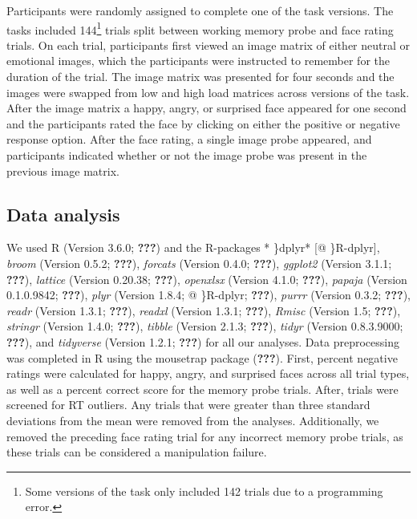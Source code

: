 \documentclass[man]{apa6}
\let\rmarkdownfootnote\footnote%
\def\footnote{\protect\rmarkdownfootnote}
\begin{document}
Participants were randomly assigned to complete one of the task versions. The tasks included 144\footnote{Some versions of the task only included 142 trials due to a programming error.} trials split between working memory probe and face rating trials. On each trial, participants first viewed an image matrix of either neutral or emotional images, which the participants were instructed to remember for the duration of the trial. The image matrix was presented for four seconds and the images were swapped from low and high load matrices across versions of the task. After the image matrix a happy, angry, or surprised face appeared for one second and the participants rated the face by clicking on either the positive or negative response option. After the face rating, a single image probe appeared, and participants indicated whether or not the image probe was present in the previous image matrix.

\hypertarget{data-analysis}{%
\subsection{Data analysis}\label{data-analysis}}

We used R (Version 3.6.0; {\textbf{???}}) and the R-packages * \}dplyr* {[}@ \}R-dplyr{]}, \emph{broom} (Version 0.5.2; {\textbf{???}}), \emph{forcats} (Version 0.4.0; {\textbf{???}}), \emph{ggplot2} (Version 3.1.1; {\textbf{???}}), \emph{lattice} (Version 0.20.38; {\textbf{???}}), \emph{openxlsx} (Version 4.1.0; {\textbf{???}}), \emph{papaja} (Version 0.1.0.9842; {\textbf{???}}), \emph{plyr} (Version 1.8.4; @ \}R-dplyr; {\textbf{???}}), \emph{purrr} (Version 0.3.2; {\textbf{???}}), \emph{readr} (Version 1.3.1; {\textbf{???}}), \emph{readxl} (Version 1.3.1; {\textbf{???}}), \emph{Rmisc} (Version 1.5; {\textbf{???}}), \emph{stringr} (Version 1.4.0; {\textbf{???}}), \emph{tibble} (Version 2.1.3; {\textbf{???}}), \emph{tidyr} (Version 0.8.3.9000; {\textbf{???}}), and \emph{tidyverse} (Version 1.2.1; {\textbf{???}}) for all our analyses. Data preprocessing was completed in R using the mousetrap package ({\textbf{???}}). First, percent negative ratings were calculated for happy, angry, and surprised faces across all trial types, as well as a percent correct score for the memory probe trials. After, trials were screened for RT outliers. Any trials that were greater than three standard deviations from the mean were removed from the analyses. Additionally, we removed the preceding face rating trial for any incorrect memory probe trials, as these trials can be considered a manipulation failure.
\end{document}
